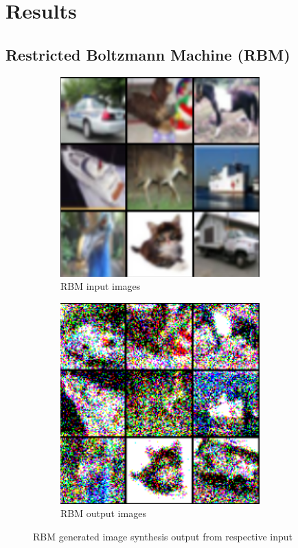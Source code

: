 \documentclass[%
 reprint,
 amsmath,amssymb,
 aps,
]{revtex4-2}
\begin{document}
\section{Results}
\subsection{Restricted Boltzmann Machine (RBM)}

\begin{figure}[h]
    \begin{subfigure}{\columnwidth}
        \centering
        \includegraphics[width=.8\linewidth]{rbmin.png}
        \caption{RBM input images}
        \label{fig:rbmin}
    \end{subfigure}
    \hfill
    \begin{subfigure}{\columnwidth}
        \centering
        \includegraphics[width=.8\linewidth]{rbmout.png}
        \caption{RBM output images}
        \label{fig:rbmout}
    \end{subfigure}
    \caption{RBM generated image synthesis output from respective input}
    \label{fig:rbmresults}
\end{figure}
\end{document}
